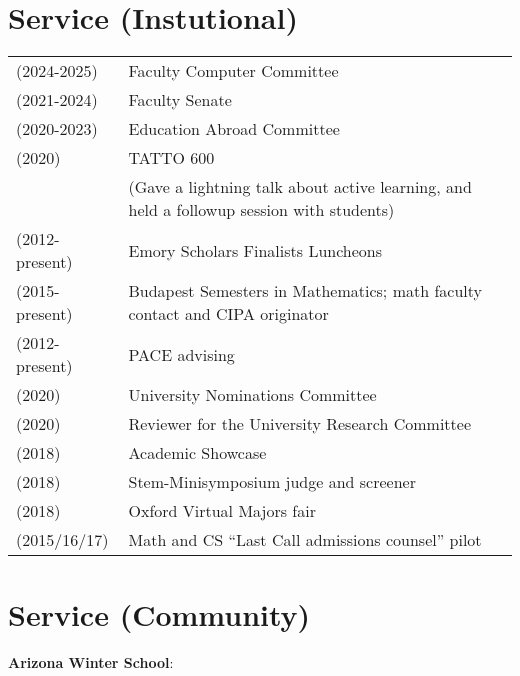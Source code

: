 \documentclass[margin,line]{res}
\begin{document}
\begin{resume}
\begin{tabular}{ll}
\end{tabular}


\section{\sc Service (Instutional)}

\begin{tabular}{ll}
  (2024-2025) & Faculty Computer Committee   \\
  (2021-2024) & Faculty Senate   \\  
  (2020-2023) & Education Abroad Committee   \\
  (2020) & TATTO 600 \\
         & (Gave a lightning talk about active learning, and held a followup session with students)  \\    
  (2012-present) & Emory Scholars Finalists Luncheons  \\  
  (2015-present) & Budapest Semesters in Mathematics; math faculty contact and CIPA originator   \\
  (2012-present) & PACE advising  \\
  (2020) & University Nominations Committee \\
  (2020) & Reviewer for the University Research Committee \\  
  (2018) & Academic Showcase   \\
  (2018) & Stem-Minisymposium judge and screener  \\
  (2018) & Oxford Virtual Majors fair  \\
  (2015/16/17) & Math and CS ``Last Call admissions counsel'' pilot    \\

\end{tabular}


\section{\sc Service (Community)}
\textbf{Arizona Winter School}:
  \vspace*{-.15in}
  

\end{resume}
\end{document}
